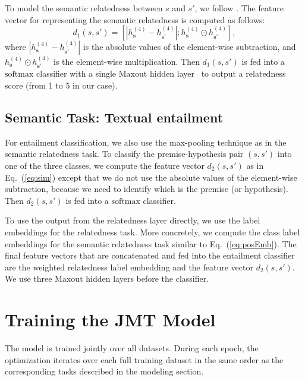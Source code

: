 \documentclass[11pt,a4paper]{article}
\begin{document}
To model the semantic relatedness between $s$ and $s'$, we follow \citet{tai2015treelstm}. The feature vector for representing the semantic relatedness is computed as follows:
\begin{equation}
\label{eq:sim}
d_1(s, s')=\left[\left|{h}^{(4)}_{\mathbf{s}}-{h}^{(4)}_{\mathbf{s}'}\right|; {h}^{(4)}_{\mathbf{s}}\odot{h}^{(4)}_{\mathbf{s}'}\right],
\end{equation}
where $\left|{h}^{(4)}_{\mathbf{s}}-{h}^{(4)}_{\mathbf{s}'}\right|$ is the absolute values of the element-wise subtraction, and ${h}^{(4)}_{\mathbf{s}}\odot{h}^{(4)}_{\mathbf{s}'}$ is the element-wise multiplication.
Then $d_1(s, s')$ is fed into a $\mathrm{softmax}$ classifier with a single $\mathrm{Maxout}$ hidden layer~\citep{goodfellow2013} to output a relatedness score (from 1 to 5 in our case).

\subsection{Semantic Task: Textual entailment}
For entailment classification, we also use the max-pooling technique as in the semantic relatedness task.
To classify the premise-hypothesis pair $(s, s')$ into one of the three classes, we compute the feature vector $d_2(s, s')$ as in Eq.~(\ref{eq:sim}) except that we do not use the absolute values of the element-wise subtraction, because we need to identify which is the premise (or hypothesis).
Then $d_2(s, s')$ is fed into a $\mathrm{softmax}$ classifier.

To use the output from the relatedness layer directly, we use the label embeddings for the relatedness task.
More concretely, we compute the class label embeddings for the semantic relatedness task similar to Eq.~(\ref{eq:posEmb}).
The final feature vectors that are concatenated and fed into the entailment classifier are the weighted relatedness label embedding and the feature vector $d_2(s, s')$.
We use three $\mathrm{Maxout}$ hidden layers before the classifier.



\section{Training the JMT Model}
\label{sec:training}
The model is trained jointly over all datasets.
During each epoch, the optimization iterates over each full training dataset in the same order as the corresponding tasks described in the modeling section.
\end{document}
